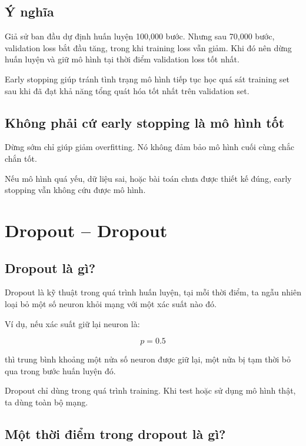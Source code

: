 \subsection{Ý nghĩa}

Giả sử ban đầu dự định huấn luyện 100,000 bước. Nhưng sau 70,000 bước, validation loss bắt đầu tăng, trong khi training loss vẫn giảm. Khi đó nên dừng huấn luyện và giữ mô hình tại thời điểm validation loss tốt nhất.

\begin{ghinho}
Early stopping giúp tránh tình trạng mô hình tiếp tục học quá sát training set sau khi đã đạt khả năng tổng quát hóa tốt nhất trên validation set.
\end{ghinho}

\subsection{Không phải cứ early stopping là mô hình tốt}

Dừng sớm chỉ giúp giảm overfitting. Nó không đảm bảo mô hình cuối cùng chắc chắn tốt.

Nếu mô hình quá yếu, dữ liệu sai, hoặc bài toán chưa được thiết kế đúng, early stopping vẫn không cứu được mô hình.

\section{Dropout -- Dropout}

\subsection{Dropout là gì?}

Dropout là kỹ thuật trong quá trình huấn luyện, tại mỗi thời điểm, ta ngẫu nhiên loại bỏ một số neuron khỏi mạng với một xác suất nào đó.

Ví dụ, nếu xác suất giữ lại neuron là:

\[
    p = 0.5
\]

thì trung bình khoảng một nửa số neuron được giữ lại, một nửa bị tạm thời bỏ qua trong bước huấn luyện đó.

\begin{ghinho}
Dropout chỉ dùng trong quá trình training. Khi test hoặc sử dụng mô hình thật, ta dùng toàn bộ mạng.
\end{ghinho}

\subsection{Một thời điểm trong dropout là gì?}

